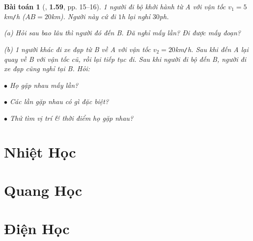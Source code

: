 \documentclass{article}
\numberwithin{equation}{section}
\newtheorem{baitoan}{Bài toán}[section]
\begin{document}
\begin{baitoan}[\cite{Van2022}, \textbf{1.59}, pp. 15--16]
	1 người đi bộ khởi hành từ A với vận tốc $v_1 = 5$\emph{km\texttt{/}h} ($AB = 20$\emph{km}). Người này cứ đi $1$\emph{h} lại nghỉ $30$\emph{ph}.
	\begin{enumerate*}
		\item[(a)] Hỏi sau bao lâu thì người đó đến B. Đã nghỉ mấy lần? Đi được mấy đoạn?
		\item[(b)] 1 người khác đi xe đạp từ B về A với vận tốc $v_2 = 20$\emph{km\texttt{/}h}. Sau khi đến A lại quay về B với vận tốc cũ, rồi lại tiếp tục đi. Sau khi người đi bộ đến B, người đi xe đạp cũng nghỉ tại B. Hỏi:
		\begin{enumerate*}
			\item[$\bullet$] Họ gặp nhau mấy lần?
			\item[$\bullet$] Các lần gặp nhau có gì đặc biệt?
			\item[$\bullet$] Thử tìm vị trí \& thời điểm họ gặp nhau?
		\end{enumerate*}
	\end{enumerate*}
\end{baitoan}


\section{Nhiệt Học}


\section{Quang Học}


\section{Điện Học}


\printbibliography[heading=bibintoc]
	
\end{document}
